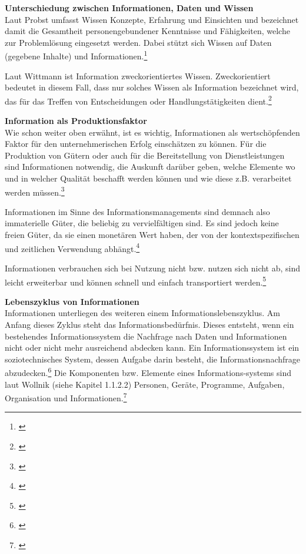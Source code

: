 \textbf{Unterschiedung zwischen Informationen, Daten und Wissen}\\
Laut Probst umfasst Wissen Konzepte, Erfahrung und Einsichten und bezeichnet damit die Gesamtheit personengebundener Kenntnisse und Fähigkeiten, welche zur Problemlösung eingesetzt werden. Dabei stützt sich Wissen auf Daten (gegebene Inhalte) und Informationen.\footnote{\cite{probst_wissen_2006}}

Laut Wittmann ist Information zweckorientiertes Wissen. Zweckorientiert bedeutet in diesem Fall, dass nur solches Wissen als Information bezeichnet wird, das für das Treffen von Entscheidungen oder Handlungstätigkeiten dient.\footnote{\cite{wittmann_unternehmung_1959}}

\textbf{Information als Produktionsfaktor}\\
Wie schon weiter oben erwähnt, ist es wichtig, Informationen als wertschöpfenden Faktor für den unternehmerischen Erfolg einschätzen zu können. Für die Produktion von Gütern oder auch für die Bereitstellung von Dienstleistungen sind Informationen notwendig, die Auskunft darüber geben, welche Elemente wo und in welcher Qualität beschafft werden können und wie diese z.B. verarbeitet werden müssen.\footnote{\cite{bode_informationsbegriff_1997}}

Informationen im Sinne des Informationsmanagements sind demnach also immaterielle Güter, die beliebig zu vervielfältigen sind. Es sind jedoch keine freien Güter, da sie einen monetären Wert haben, der von der kontextspezifischen und zeitlichen Verwendung abhängt.\footnote{\cite{krcmar_informationsmanagement_2015}}

Informationen verbrauchen sich bei Nutzung nicht bzw. nutzen sich nicht ab, sind leicht erweiterbar und können schnell und einfach transportiert werden.\footnote{\cite{teubner_information_2005}}

\textbf{Lebenszyklus von Informationen}\\
Informationen unterliegen des weiteren einem Informationslebenszyklus. Am Anfang dieses Zyklus steht das Informationsbedürfnis. Dieses entsteht, wenn ein bestehendes Informationssystem die Nachfrage nach Daten und Informationen nicht oder nicht mehr ausreichend abdecken kann. Ein Informationssystem ist ein soziotechnisches System, dessen Aufgabe darin besteht, die Informationsnachfrage abzudecken.\footnote{\cite{GluchowskiGabrielDittmar_ManagementSupportSysteme_2008}} Die Komponenten bzw. Elemente eines Informations-systems sind laut Wollnik (siehe Kapitel 1.1.2.2) Personen, Geräte, Programme, Aufgaben, Organisation und Informationen.\footnote{\cite[34-43]{wollnik_informationsmanagement_1988}}

